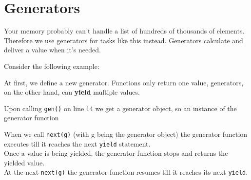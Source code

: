 \section{Generators}
    Your memory probably can't handle a list of hundreds of thousands of elements.
    Therefore we use generators for tasks like this instead.
    Generators calculate and deliver a value when it's needed.
    
    Consider the following example:

    
    At first, we define a new generator.
    Functions only return one value, generators, on the other hand, can
    \textbf{yield} multiple values.
    
    Upon calling \texttt{gen()} on line 14 we get a generator object, so an instance
    of the generator function
    
    When we call \texttt{next(g)} (with g being the generator object) the generator
    function executes till it reaches the next \texttt{yield} statement.\\
    Once a value is being yielded, the generator function stops and returns
    the yielded value.\\
    At the next \texttt{next(g)} the generator function resumes till it reaches
    its next \texttt{yield}.
    
    
    